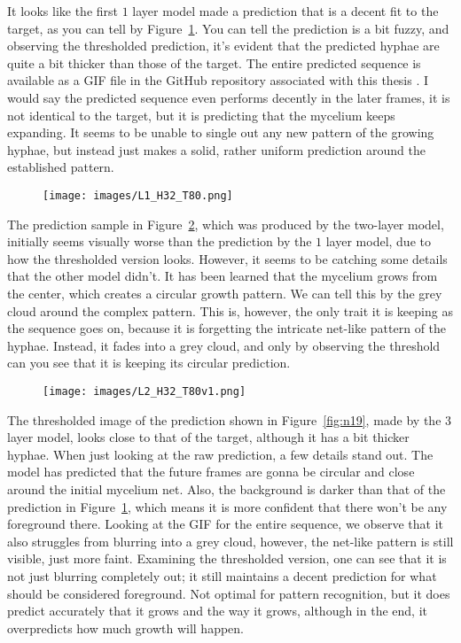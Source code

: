 \documentclass[a4paper,12pt]{article}
\begin{document}
It looks like the first $1$ layer model made a prediction that is a decent fit to the target, as you can tell by Figure~\ref{fig:n17}. You can tell the prediction is a bit fuzzy, and observing the thresholded prediction, it's evident that the predicted hyphae are quite a bit thicker than those of the target. The entire predicted sequence is available as a GIF file in the GitHub repository associated with this thesis \cite{gagarahn2025bachelor}.
I would say the predicted sequence even performs decently in the later frames, it is not identical to the target, but it is predicting that the mycelium keeps expanding. It seems to be unable to single out any new pattern of the growing hyphae, but instead just makes a solid, rather uniform prediction around the established pattern.
\begin{figure}[H]
\centering
\texttt{[image: images/L1\_H32\_T80.png]}
\caption{} %
\label{fig:n17}
\end{figure}
The prediction sample in Figure~\ref{fig:n18}, which was produced by the two-layer model, initially seems visually worse than the prediction by the $1$ layer model, due to how the thresholded version looks. However, it seems to be catching some details that the other model didn't. It has been learned that the mycelium grows from the center, which creates a circular growth pattern. We can tell this by the grey cloud around the complex pattern. This is, however, the only trait it is keeping as the sequence goes on, because it is forgetting the intricate net-like pattern of the hyphae. Instead, it fades into a grey cloud, and only by observing the threshold can you see that it is keeping its circular prediction.
\begin{figure}[H]
\centering
\texttt{[image: images/L2\_H32\_T80v1.png]}
\caption{} %
\label{fig:n18}
\end{figure}
The thresholded image of the prediction shown in Figure~\ref{fig:n19}, made by the $3$ layer model, looks close to that of the target, although it has a bit thicker hyphae. When just looking at the raw prediction, a few details stand out. The model has predicted that the future frames are gonna be circular and close around the initial mycelium net. Also, the background is darker than that of the prediction in Figure~\ref{fig:n17}, which means it is more confident that there won't be any foreground there. Looking at the GIF for the entire sequence, we observe that it also struggles from blurring into a grey cloud, however, the net-like pattern is still visible, just more faint. Examining the thresholded version, one can see that it is not just blurring completely out; it still maintains a decent prediction for what should be considered foreground. Not optimal for pattern recognition, but it does predict accurately that it grows and the way it grows, although in the end, it overpredicts how much growth will happen.
\end{document}
